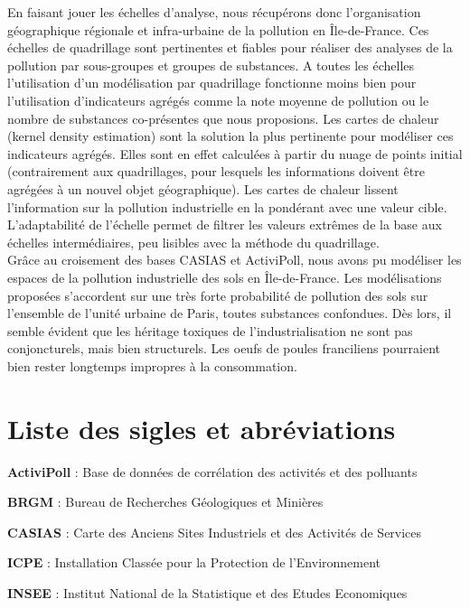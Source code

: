 \documentclass[a4paper,twoside,12pt]{book}
\begin{document}
En faisant jouer les échelles d'analyse, nous récupérons donc l'organisation géographique régionale et infra-urbaine de la pollution en Île-de-France. Ces échelles de quadrillage sont pertinentes et fiables pour réaliser des analyses de la pollution par sous-groupes et groupes de substances. A toutes les échelles l'utilisation d'un modélisation par quadrillage fonctionne moins bien pour l'utilisation d'indicateurs agrégés comme la note moyenne de pollution ou le nombre de substances co-présentes que nous proposions. Les cartes de chaleur (kernel density estimation) sont la solution la plus pertinente pour modéliser ces indicateurs agrégés. Elles sont en effet calculées à partir du nuage de points initial (contrairement aux quadrillages, pour lesquels les informations doivent être agrégées à un nouvel objet géographique). Les cartes de chaleur lissent l'information sur la pollution industrielle en la pondérant avec une valeur cible. L'adaptabilité de l'échelle permet de filtrer les valeurs extrêmes de la base aux échelles intermédiaires, peu lisibles avec la méthode du quadrillage.  \\

Grâce au croisement des bases CASIAS et ActiviPoll, nous avons pu modéliser les espaces de la pollution industrielle des sols en Île-de-France. Les modélisations proposées s'accordent sur une très forte probabilité de pollution des sols sur l'ensemble de l'unité urbaine de Paris, toutes substances confondues. Dès lors, il semble évident que les héritage toxiques de l'industrialisation ne sont pas conjoncturels, mais bien structurels. Les oeufs de poules franciliens pourraient bien rester longtemps impropres à la consommation. 




\chapter*{Liste des sigles et abréviations}

\textbf{ActiviPoll} : Base de données de corrélation des activités et des polluants

\textbf{BRGM} : Bureau de Recherches Géologiques et Minières 

\textbf{CASIAS} : Carte des Anciens Sites Industriels et des Activités de Services

\textbf{ICPE} : Installation Classée pour la Protection de l'Environnement

\textbf{INSEE} : Institut National de la Statistique et des Etudes Economiques 

\printbibliography

\backmatter


\listoffigures
\tableofcontents
\end{document}
